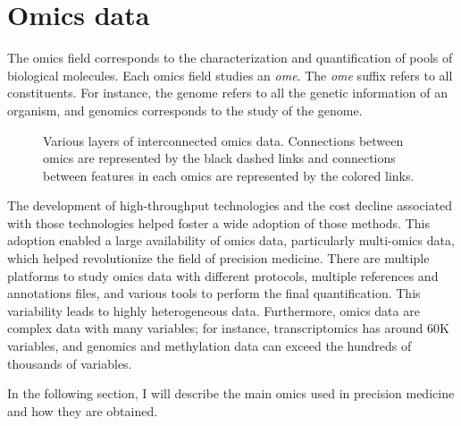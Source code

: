 \documentclass[../main.tex]{subfiles}
\begin{document}
\section{Omics data}
	The omics field corresponds to the characterization and quantification of pools of biological molecules.
	Each omics field studies an \emph{ome}.
	The \emph{ome} suffix refers to all constituents.
	For instance, the genome refers to all the genetic information of an organism, and genomics corresponds to the study of the genome.

	\begin{figure}[htbp]
		\centering
		\ifSubfilesClassLoaded{%
		}{
		}
		\caption[Multi-omics layers]{Various layers of interconnected omics data. Connections between omics are represented by the black dashed links and connections between features in each omics are represented by the colored links.}\label{fig:multiomics_layers}
	\end{figure}

	The development of high-throughput technologies and the cost decline associated with those technologies helped foster a wide adoption of those methods.
	This adoption enabled a large availability of omics data, particularly multi-omics data, which helped revolutionize the field of precision medicine.
	There are multiple platforms to study omics data with different protocols, multiple references and annotations files, and various tools to perform the final quantification.
	This variability leads to highly heterogeneous data.
	Furthermore, omics data are complex data with many variables; for instance, transcriptomics has around 60K variables, and genomics and methylation data can exceed the hundreds of thousands of variables.

	In the following section, I will describe the main omics used in precision medicine and how they are obtained.
\end{document}
